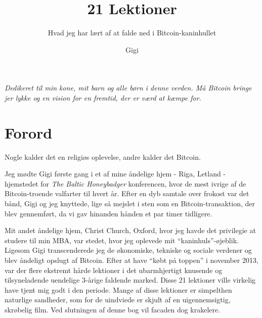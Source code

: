 \documentclass[paper=6in:9in,pagesize=pdftex,headinclude=on,footinclude=on,12pt]{scrbook}
\begin{document}
\frontmatter

\title{21 Lektioner}
\subtitle{Hvad jeg har lært af at falde ned i Bitcoin-kaninhullet}
\author{Gigi}
\date{}

\maketitle

\cleardoublepage

\newpage \vspace*{8cm}%

\thispagestyle{fancy}
\begin{center}
  \Large \emph{ Dedikeret til min kone, mit barn og alle børn i denne verden. Må Bitcoin bringe jer lykke og en vision for en fremtid, der er værd at kæmpe for. } \end{center}

\chapter*{Forord}

Nogle kalder det en religiøs oplevelse, andre kalder det Bitcoin.

Jeg mødte Gigi første gang i et af mine åndelige hjem - Riga, Letland - hjemstedet for \textit{The Baltic Honeybadger} konferencen, hvor de mest ivrige af de Bitcoin-troende valfarter til hvert år. Efter en dyb samtale over frokost var det bånd, Gigi og jeg knyttede, lige så mejslet i sten som en Bitcoin-transaktion, der blev gennemført, da vi gav hinanden hånden et par timer tidligere.

Mit andet åndelige hjem, Christ Church, Oxford, hvor jeg havde det privilegie at studere til min MBA, var stedet, hvor jeg oplevede mit \enquote{kaninhuls}-øjeblik. Ligesom Gigi transcenderede jeg de økonomiske, tekniske og sociale verdener og blev åndeligt opslugt af Bitcoin. Efter at have \enquote{købt på toppen} i november 2013, var der flere ekstremt hårde lektioner i det ubarmhjertigt knusende og tilsyneladende uendelige 3-årige faldende marked. Disse 21 lektioner ville virkelig have tjent mig godt i den periode. Mange af disse lektioner er simpelthen naturlige sandheder, som for de uindviede er skjult af en uigennemsigtig, skrøbelig film. Ved slutningen af denne bog vil facaden dog krakelere.
\end{document}
